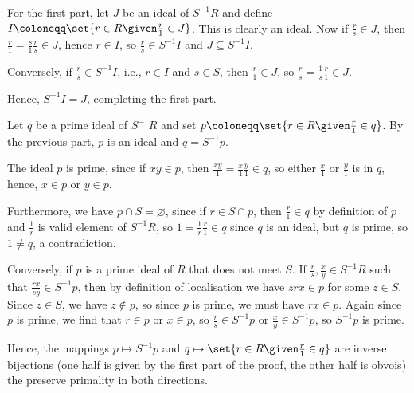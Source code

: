 For the first part, let $J$ be an ideal of $S^{-1}R$ and define
$I\coloneqq \set{r \in R\given \frac{r}{1} \in J}$. This is clearly an ideal.
Now if $\frac{r}{s} \in J$, then $\frac{r}{1} = \frac{s}{1}\frac{r}{s} \in J$,
hence $r \in I$, so $\frac{r}{s} \in S^{-1}I$ and $J \subseteq S^{-1}I$.

Conversely, if $\frac{r}{s} \in S^{-1}I$, i.e., $r \in I$ and $s \in S$, then
$\frac{r}{1} \in J$, so $\frac{r}{s} = \frac{1}{s}\frac{r}{1} \in J$.

Hence, $S^{-1}I = J$, completing the first part.

Let $q$ be a prime ideal of $S^{-1}R$ and set $p\coloneqq\set{r \in R\given \frac{r}{1} \in q}$.
By the previous part, $p$ is an ideal and $q = S^{-1}p$.

The ideal $p$ is prime, since if $xy \in p$, then $\frac{xy}{1} = \frac{x}{1}\frac{y}{1} \in q$, so either
$\frac{x}{1}$ or $\frac{y}{1}$ is in $q$, hence, $x \in p$ or $y \in p$.

Furthermore, we have $p \cap S = \varnothing$, since if $r \in S\cap p$, then
$\frac{r}{1} \in q$ by definition of $p$ and $\frac{1}{r}$ is valid element of
$S^{-1}R$, so $1 = \frac{1}{r}\frac{r}{1} \in q$ since $q$ is an ideal, but
$q$ is prime, so $1 \neq q$, a contradiction.

Conversely, if $p$ is a prime ideal of $R$ that does not meet $S$. If
$\frac{r}{s}, \frac{x}{y} \in S^{-1}R$ such that $\frac{rx}{sy} \in S^{-1}p$,
then by definition of localisation we have $zrx \in p$ for some $z \in S$.
Since $z \in S$, we have $z\notin p$, so since $p$ is prime, we must have
$rx \in p$. Again since $p$ is prime, we find that $r \in p$ or $x \in p$, so
$\frac{r}{s} \in S^{-1}p$ or $\frac{x}{y} \in S^{-1}p$, so $S^{-1}p$ is prime.

Hence, the mappings $p \mapsto S^{-1}p$ and $q\mapsto\set{r \in R\given \frac{r}{1} \in q}$
are inverse bijections (one half is given by the first part of the proof,
the other half is obvois) the preserve primality in both directions.
